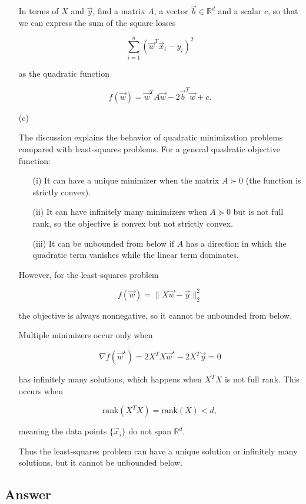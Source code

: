 \documentclass[
  12pt,
]{fphw}
\begin{document}
\begin{enumerate}
In terms of $X$ and $\vec{y}$, find a matrix $A$, a vector $\vec{b} \in \mathbb{R}^d$ and a scalar $c$, so that we can express the sum of the square losses

\[
\sum_{i=1}^{n} ( \vec{w}^T \vec{x}_i - y_i )^2
\]

as the quadratic function

\[
f(\vec{w}) = \vec{w}^T A \vec{w} - 2\vec{b}^T \vec{w} + c.
\]

\item[(e)]

The discussion explains the behavior of quadratic minimization problems compared with least-squares problems.
For a general quadratic objective function:

\begin{enumerate}
\item[(i)] It can have a unique minimizer when the matrix $A \succ 0$ (the function is strictly convex).

\item[(ii)] It can have infinitely many minimizers when $A \succeq 0$ but is not full rank, so the objective is convex but not strictly convex.

\item[(iii)] It can be unbounded from below if $A$ has a direction in which the quadratic term vanishes while the linear term dominates.
\end{enumerate}

However, for the least-squares problem

\[
f(\vec w)=\|X\vec w-\vec y\|_2^2
\]

the objective is always nonnegative, so it cannot be unbounded from below.

Multiple minimizers occur only when

\[
\nabla f(\vec w^\star)=2X^TX\vec w^\star-2X^T\vec y=0
\]

has infinitely many solutions, which happens when $X^TX$ is not full rank. This occurs when

\[
\text{rank}(X^TX)=\text{rank}(X)<d,
\]

meaning the data points $\{\vec x_i\}$ do not span $\mathbb{R}^d$.

Thus the least-squares problem can have a unique solution or infinitely many solutions, but it cannot be unbounded below.


\end{enumerate}

\subsection*{Answer}
\end{document}
